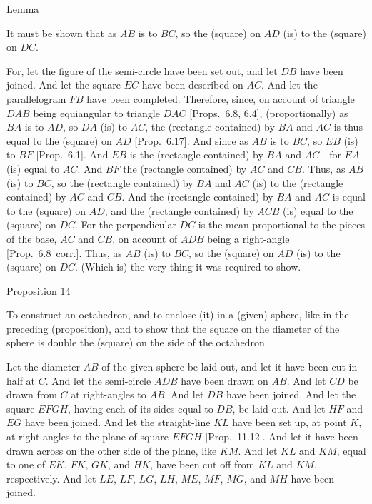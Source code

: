 \epsfysize=2.5in
\centerline{}

\begin{center}
{\large Lemma}
\end{center}

It must be shown that as $AB$ is to $BC$, so the (square) on
$AD$ (is) to the (square) on $DC$.

For, let the figure of the semi-circle have been set out, and let $DB$ have
been joined. And let the square $EC$ have been described on
$AC$. And let the parallelogram $FB$ have been completed. 
Therefore, since, on account of triangle $DAB$ being
equiangular to  triangle $DAC$ [Props.~6.8, 6.4], (proportionally) as $BA$
is to $AD$, so $DA$ (is) to $AC$,  the (rectangle contained)
by $BA$ and $AC$  is thus equal to the (square) on $AD$ [Prop.~6.17]. 
And since as $AB$ is to $BC$, so $EB$ (is) to $BF$ [Prop.~6.1].
And $EB$ is  the (rectangle contained) by $BA$ and $AC$---for $EA$ (is) equal to $AC$. And $BF$  the (rectangle
contained) by $AC$ and $CB$. Thus, as $AB$ (is) to $BC$,
so the (rectangle contained) by $BA$ and $AC$ (is) to the
(rectangle contained) by $AC$ and $CB$. And the (rectangle contained)
by $BA$ and $AC$ is equal to the (square) on $AD$, and the
(rectangle contained) by $ACB$ (is) equal to the (square) on 
$DC$. For the perpendicular $DC$ is the mean proportional
to the pieces  of the base, $AC$ and $CB$, on account of
$ADB$ being a right-angle [Prop.~6.8~corr.]. Thus, as
$AB$ (is) to $BC$, so the (square) on $AD$ (is) to the (square)
on $DC$. (Which is) the very thing it was required to show.


\begin{center}
{\large Proposition 14}
\end{center}

To construct an octahedron, and to enclose (it) in a (given) sphere, like in the preceding (proposition), and to show that the square
on the diameter of the sphere is double the (square) on the
side of the octahedron.

Let the diameter $AB$ of the given sphere be laid out, and let it have
been cut in half at $C$. And let the semi-circle $ADB$ have been
drawn on $AB$. And let $CD$ be drawn from $C$ at right-angles to
$AB$. And let $DB$ have been joined. And let the square $EFGH$,
having each of its sides equal to $DB$, be laid out. And let $HF$
and $EG$ have been joined. And let the straight-line $KL$
have been set up, at point $K$, at right-angles to the plane of square 
$EFGH$ [Prop.~11.12]. And let it have been drawn across  on the other side of
the plane, like $KM$. And let $KL$ and $KM$, equal to
one of $EK$, $FK$, $GK$, and $HK$,  have been cut off from 
$KL$ and $KM$, respectively. And let $LE$, $LF$, $LG$, $LH$, $ME$, $MF$,
$MG$, and $MH$ have been joined.  


